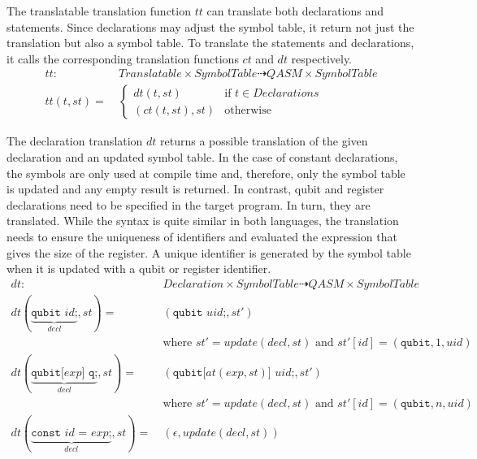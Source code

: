 The translatable translation function $tt$ can translate both declarations and statements. Since declarations may adjust the symbol table, it return not just the translation but also a symbol table. To translate the statements and declarations, it calls the corresponding translation functions $ct$ and $dt$ respectively.
\begin{align*}
    tt : \ & Translatable \times SymbolTable \dashrightarrow QASM \times SymbolTable\\
    tt(t, st) = \ & \begin{cases}
        dt(t, st)  \quad &\text{if } t \in Declarations\\
        (ct(t, st), st) &\text{otherwise }
    \end{cases}  
\end{align*}

The declaration translation $dt$ returns a possible translation of the given declaration and an updated symbol table. In the case of constant declarations, the symbols are only used at compile time and, therefore, only the symbol table is updated and any empty result is returned. In contrast, qubit and register declarations need to be specified in the target program. In turn, they are translated. While the syntax is quite similar in both languages, the translation needs to ensure the uniqueness of identifiers and evaluated the expression that gives the size of the register. A unique identifier is generated by the symbol table when it is updated with a qubit or register identifier.
\begin{align*}
    dt : \ & Declaration \times SymbolTable \dashrightarrow QASM \times SymbolTable\\
    dt(\underbrace{\texttt{qubit } id \text{;}}_{decl}, st) = \ & (\texttt{qubit } uid\texttt{;}, st')\\
                                                                & \text{where } st' = update(decl, st) \text{ and } st'[id] = (\texttt{qubit}, 1, uid)\\
    dt(\underbrace{\texttt{qubit[} exp \texttt{] q;}}_{decl}, st) = \ & (\texttt{qubit[} at(exp, st) \texttt{] } uid\texttt{;}, st')\\
                                                                & \text{where } st' = update(decl, st) \text{ and } st'[id] = (\texttt{qubit}, n, uid)\\
    dt(\underbrace{\texttt{const } id \texttt{ = } exp \texttt{;}}_{decl}, st) = \ & (\epsilon, update(decl, st))
\end{align*}

